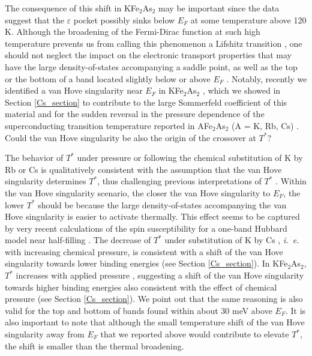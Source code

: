 \documentclass[twocolumn,aps,showpacs,preprintnumbers,amsmath,amssymb, superscriptaddress,longbibliography]{revtex4-1}
\begin{document}
The consequence of this shift in KFe$_2$As$_2$ may be important since the data suggest that the $\varepsilon$ pocket possibly sinks below $E_F$ at some temperature above 120 K. Although the broadening of the Fermi-Dirac function at such high temperature prevents us from calling this phenomenon a Lifshitz transition \cite{Lifshitz_JETP11}, one should not neglect the impact on the electronic transport properties that may have the large density-of-states accompanying a saddle point, as well as the top or the bottom of a band located slightly below or above $E_F$ \cite{FinkEPL113,Drechsler_PSSB254}. Notably, recently we identified a van Hove singularity near $E_F$ in KFe$_2$As$_2$ \cite{DL_Fang_vHs}, which we showed in Section \ref{Cs_section} to contribute to the large Sommerfeld coefficient of this material \cite{YP_Wu_PRL116} and for the sudden reversal in the pressure dependence of the superconducting transition temperature reported in AFe$_2$As$_2$ (A = K, Rb, Cs) \cite{Tafti_nphys9,Tafti_PRB89,Tafti_PRB91,Wiecki_PRB97}. Could the van Hove singularity be also the origin of the crossover at $T^*$? 

The behavior of $T^*$ under pressure or following the chemical substitution of K by Rb or Cs is qualitatively consistent with the assumption that the van Hove singularity determines $T^*$, thus challenging previous interpretations of $T^*$ \cite{Hardy_PRL111,YP_Wu_PRL116}. Within the van Hove singularity scenario, the closer the van Hove singularity to $E_F$, the lower $T^*$ should be because the large density-of-states accompanying the van Hove singularity is easier to activate thermally. This effect seems to be captured by very recent calculations of the spin susceptibility for a one-band Hubbard model near half-filling \cite{Nourafkan_Knight_shift}. The decrease of $T^*$ under substitution of K by Cs \cite{Wiecki_PRB97}, \textit{i.~e.} with increasing chemical pressure, is consistent with a shift of the van Hove singularity towards lower binding energies (see Section \ref{Cs_section}). In KFe$_2$As$_2$, $T^*$ increases with applied pressure \cite{Wiecki_PRB97}, suggesting a shift of the van Hove singularity towards higher binding energies also consistent with the effect of chemical pressure (see Section \ref{Cs_section}). We point out that the same reasoning is also valid for the top and bottom of bands found within about 30 meV above $E_F$. It is also important to note that although the small temperature shift of the van Hove singularity away from $E_F$ that we reported above would contribute to elevate $T^*$, the shift is smaller than the thermal broadening.
\end{document}
